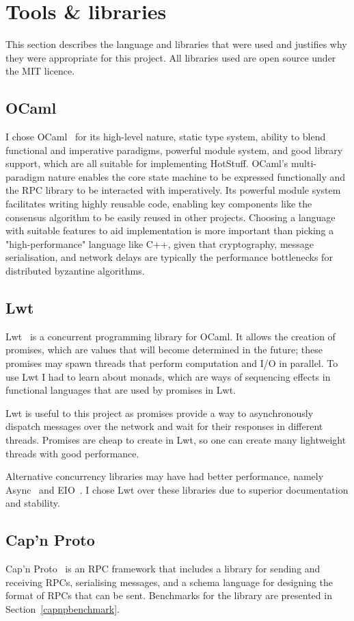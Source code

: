 \section{Tools \& libraries} \label{tools}
This section describes the language and libraries that were used and justifies why they were appropriate for this project. All libraries used are open source under the MIT licence.

\subsection{OCaml}
I chose OCaml~\cite{ocaml} for its high-level nature, static type system, ability to blend functional and imperative paradigms, powerful module system, and good library support, which are all suitable for implementing HotStuff. OCaml's multi-paradigm nature enables the core state machine to be expressed functionally and the RPC library to be interacted with imperatively. Its powerful module system facilitates writing highly reusable code, enabling key components like the consensus algorithm to be easily reused in other projects. Choosing a language with suitable features to aid implementation is more important than picking a "high-performance" language like C++, given that cryptography, message serialisation, and network delays are typically the performance bottlenecks for distributed byzantine algorithms.

\subsection{Lwt}
Lwt~\cite{lwt} is a concurrent programming library for OCaml. It allows the creation of promises, which are values that will become determined in the future; these promises may spawn threads that perform computation and I/O in parallel. To use Lwt I had to learn about monads, which are ways of sequencing effects in functional languages that are used by promises in Lwt.

Lwt is useful to this project as promises provide a way to asynchronously dispatch messages over the network and wait for their responses in different threads. Promises are cheap to create in Lwt, so one can create many lightweight threads with good performance.

Alternative concurrency libraries may have had better performance, namely Async~\cite{async} and EIO~\cite{eio}. I chose Lwt over these libraries due to superior documentation and stability.

\subsection{Cap'n Proto}
Cap'n Proto~\cite{capnp} is an RPC framework that includes a library for sending and receiving RPCs, serialising messages, and a schema language for designing the format of RPCs that can be sent. Benchmarks for the library are presented in Section~\ref{capnpbenchmark}.

